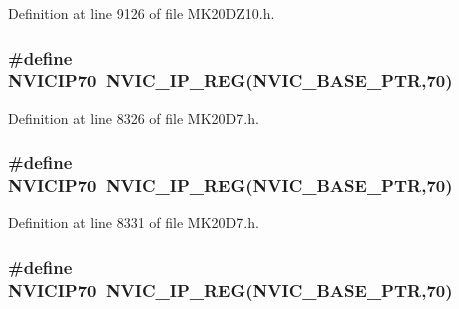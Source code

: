 Definition at line 9126 of file M\+K20\+D\+Z10.\+h.

\subsubsection[{\texorpdfstring{N\+V\+I\+C\+I\+P70}{NVICIP70}}]{\setlength{\rightskip}{0pt plus 5cm}\#define N\+V\+I\+C\+I\+P70~{\bf N\+V\+I\+C\+\_\+\+I\+P\+\_\+\+R\+EG}({\bf N\+V\+I\+C\+\_\+\+B\+A\+S\+E\+\_\+\+P\+TR},70)}\hypertarget{group___n_v_i_c___register___accessor___macros_gaf28c101b0a5021931258ba845b7fdac4}{}\label{group___n_v_i_c___register___accessor___macros_gaf28c101b0a5021931258ba845b7fdac4}


Definition at line 8326 of file M\+K20\+D7.\+h.

\subsubsection[{\texorpdfstring{N\+V\+I\+C\+I\+P70}{NVICIP70}}]{\setlength{\rightskip}{0pt plus 5cm}\#define N\+V\+I\+C\+I\+P70~{\bf N\+V\+I\+C\+\_\+\+I\+P\+\_\+\+R\+EG}({\bf N\+V\+I\+C\+\_\+\+B\+A\+S\+E\+\_\+\+P\+TR},70)}\hypertarget{group___n_v_i_c___register___accessor___macros_gaf28c101b0a5021931258ba845b7fdac4}{}\label{group___n_v_i_c___register___accessor___macros_gaf28c101b0a5021931258ba845b7fdac4}


Definition at line 8331 of file M\+K20\+D7.\+h.

\subsubsection[{\texorpdfstring{N\+V\+I\+C\+I\+P70}{NVICIP70}}]{\setlength{\rightskip}{0pt plus 5cm}\#define N\+V\+I\+C\+I\+P70~{\bf N\+V\+I\+C\+\_\+\+I\+P\+\_\+\+R\+EG}({\bf N\+V\+I\+C\+\_\+\+B\+A\+S\+E\+\_\+\+P\+TR},70)}\hypertarget{group___n_v_i_c___register___accessor___macros_gaf28c101b0a5021931258ba845b7fdac4}{}\label{group___n_v_i_c___register___accessor___macros_gaf28c101b0a5021931258ba845b7fdac4}


